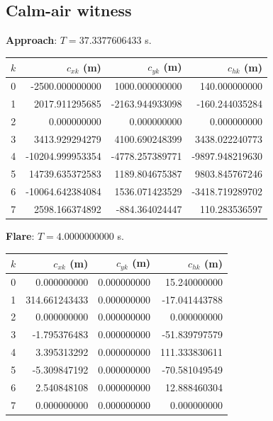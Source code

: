 \subsection*{Calm-air witness}
\textbf{Approach}: $T=37.3377606433$ s.\par
\begin{center}\small\begin{tabular}{@{}rrrr@{}}\toprule $k$ & $c_{xk}$ (m) & $c_{yk}$ (m) & $c_{hk}$ (m)\\\midrule
0 & -2500.000000000 & 1000.000000000 & 140.000000000\\
1 & 2017.911295685 & -2163.944933098 & -160.244035284\\
2 & 0.000000000 & 0.000000000 & 0.000000000\\
3 & 3413.929294279 & 4100.690248399 & 3438.022240773\\
4 & -10204.999953354 & -4778.257389771 & -9897.948219630\\
5 & 14739.635372583 & 1189.804675387 & 9803.845767246\\
6 & -10064.642384084 & 1536.071423529 & -3418.719289702\\
7 & 2598.166374892 & -884.364024447 & 110.283536597\\
\bottomrule\end{tabular}\end{center}
\textbf{Flare}: $T=4.0000000000$ s.\par
\begin{center}\small\begin{tabular}{@{}rrrr@{}}\toprule $k$ & $c_{xk}$ (m) & $c_{yk}$ (m) & $c_{hk}$ (m)\\\midrule
0 & 0.000000000 & 0.000000000 & 15.240000000\\
1 & 314.661243433 & 0.000000000 & -17.041443788\\
2 & 0.000000000 & 0.000000000 & 0.000000000\\
3 & -1.795376483 & 0.000000000 & -51.839797579\\
4 & 3.395313292 & 0.000000000 & 111.333830611\\
5 & -5.309847192 & 0.000000000 & -70.581049549\\
6 & 2.540848108 & 0.000000000 & 12.888460304\\
7 & 0.000000000 & 0.000000000 & 0.000000000\\
\bottomrule\end{tabular}\end{center}
\par\medskip
